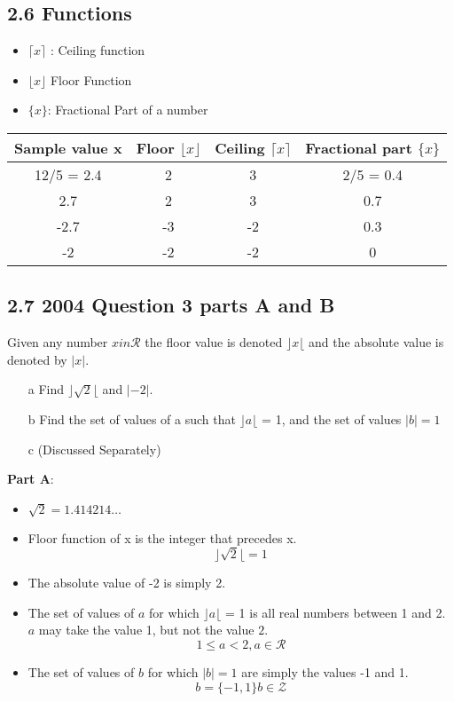 \documentclass[12 pt]{article}
\begin{document}

\subsection*{2.6 Functions}
\begin{itemize}
\item $\lceil x\rceil$ : Ceiling function
\item $\lfloor x\rfloor$ Floor Function
\item $\{x\}$: Fractional Part of a number
\end{itemize}

\begin{tabular}{|c|c|c|c|} \hline
Sample value x & Floor $\lfloor x\rfloor$ & Ceiling  $\lceil x\rceil$ & Fractional part $ \{ x \} $\\ \hline
12/5 = 2.4 &	2	&3&	2/5 = 0.4\\
2.7&	2&	3	&0.7\\
-2.7&	-3&	-2	&0.3\\
-2&	-2&	-2	&0\\\hline
\end{tabular} 

\subsection*{2.7 2004 Question 3 parts A and B}
Given any number $x in \mathcal{R}$ the floor value is denoted $\rfloor x \lfloor$ and the absolute value is denoted by $|x|$.

\begin{itemize}
\item[a] Find $\rfloor \sqrt{2} \lfloor$ and $|-2|$.
\item[b] Find the set of values of a such that $\rfloor a \lfloor$ = 1, and the set of values $|b| = 1$
\item[c] (Discussed Separately)
\end{itemize}

\textbf{Part A}: 
\begin{itemize}
\item $\sqrt{2} = 1.414214 \ldots$
\item Floor function of x is the integer that precedes x.
\[\rfloor \sqrt{2} \lfloor = 1\]
\item The absolute value of -2 is simply 2.
\item The set of values of $a$ for which $\rfloor a \lfloor$ = 1 is all real numbers between 1 and 2. $a$ may take the value 1, but not the value $2$.
\[ 1 \leq a <2 , a \in \mathcal{R}\]
\item The set of values of $b$ for which $|b| = 1$ are simply the values -1 and 1.
\[ b= \{-1,1\}  b \in \mathcal{Z}\]
\end{itemize}
\end{document}

